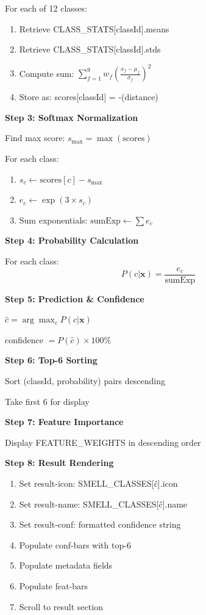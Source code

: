 \documentclass[12pt,a4paper]{article}
\begin{document}
For each of 12 classes:
\begin{enumerate}
    \item Retrieve CLASS\_STATS[classId].means
    \item Retrieve CLASS\_STATS[classId].stds
    \item Compute sum: $\sum_{f=1}^{9} w_f \left(\frac{x_f - \mu_f}{\sigma_f}\right)^2$
    \item Store as: scores[classId] = -(distance)
\end{enumerate}

\textbf{Step 3: Softmax Normalization}

Find max score: $s_{\max} = \max(\text{scores})$

For each class:
\begin{enumerate}
    \item $s_c \gets \text{scores}[c] - s_{\max}$
    \item $e_c \gets \exp(3 \times s_c)$
    \item Sum exponentials: $\text{sumExp} \gets \sum e_c$
\end{enumerate}

\textbf{Step 4: Probability Calculation}

For each class:
$$P(c|\mathbf{x}) = \frac{e_c}{\text{sumExp}}$$

\textbf{Step 5: Prediction \& Confidence}

$\hat{c} = \arg\max_c P(c|\mathbf{x})$

confidence $= P(\hat{c}) \times 100\%$

\textbf{Step 6: Top-6 Sorting}

Sort (classId, probability) pairs descending

Take first 6 for display

\textbf{Step 7: Feature Importance}

Display FEATURE\_WEIGHTS in descending order

\textbf{Step 8: Result Rendering}

\begin{enumerate}
    \item Set result-icon: SMELL\_CLASSES[\^c].icon
    \item Set result-name: SMELL\_CLASSES[\^c].name
    \item Set result-conf: formatted confidence string
    \item Populate conf-bars with top-6
    \item Populate metadata fields
    \item Populate feat-bars
    \item Scroll to result section
\end{enumerate}
\end{document}
